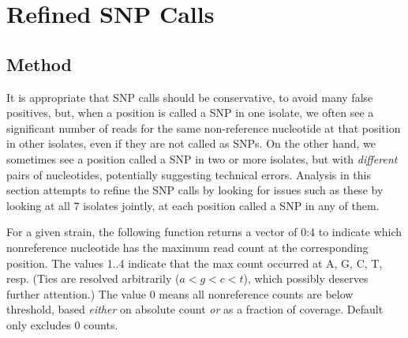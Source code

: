 \documentclass{article}\usepackage[]{graphicx}\usepackage[]{color}
\begin{document}
\section{Refined SNP Calls}
\label{sec:refined}
\subsection{Method}

It is appropriate that SNP calls should be conservative, to avoid many false positives, but, when a position is called a SNP in one isolate, we often see a significant number of reads for the same non-reference nucleotide at that position in other isolates, even if they are not called as SNPs.  On the other hand, we sometimes see a position called a SNP in two or more isolates, but with \emph{different} pairs of nucleotides, potentially suggesting technical errors.  Analysis in this section attempts to refine the SNP calls by  looking for issues such as these by looking at all 7 isolates jointly, at each position called a SNP in any of them.

For a given strain, the following function returns a vector of 0:4 to indicate which nonreference nucleotide has the
maximum read count at the corresponding position.  The values 1..4 indicate that the max count occurred at A, G, C, T,
resp.  (Ties are resolved arbitrarily ($a<g<c<t$), which possibly deserves further attention.)  The value 0 means all
nonreference counts are below threshold, based \emph{either} on absolute count \emph{or} as a fraction of coverage.
Default only excludes 0 counts.
\end{document}
